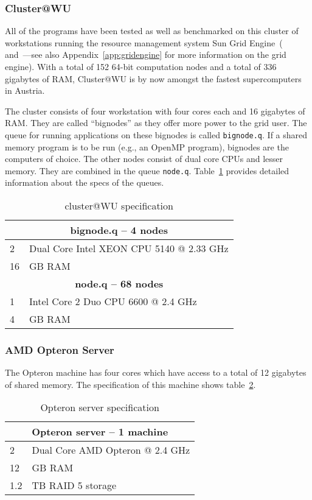 \begin{description}
\begin{description}
\subsubsection{Cluster@WU}
All of the programs
have been tested as well as benchmarked on this cluster of
workstations running the resource management system Sun Grid 
Engine~(\cite{gentzsch02sge} and~\cite{sge07}---see also
Appendix~\ref{app:gridengine} for more information on the 
grid engine). With a total of 152 64-bit computation nodes and a total
of 336 gigabytes of RAM, Cluster@WU is by now amongst the fastest
supercomputers in Austria.

The cluster consists of four workstation with four cores each and 16
gigabytes of RAM. They are called ``bignodes'' as they offer more
power to the grid user. The queue for running applications on these
bignodes is called \texttt{bignode.q}. If a shared memory program is
to be run (e.g., an OpenMP program), bignodes are the computers of choice.
The other nodes consist of dual core CPUs and lesser
memory. They are combined in the queue
\texttt{node.q}. Table~\ref{tab:clusterWU} provides detailed
information about the specs of the queues.

\begin{table}[h!b!p!]
\caption{cluster@WU specification}
\centering
\label{tab:clusterWU}
\begin{tabular}{|l|l|}
\hline
\multicolumn{2}{|c|}{\textbf{bignode.q -- 4 nodes}}\\
\hline
2  & Dual Core Intel XEON CPU 5140 @ 2.33 GHz\\
16 & GB RAM\\
\hline
\multicolumn{2}{|c|}{\textbf{node.q -- 68 nodes}}\\
\hline
1 & Intel Core 2 Duo CPU 6600 @ 2.4 GHz\\
4 & GB RAM\\
\hline
\end{tabular}
\end{table}

\subsubsection{AMD Opteron Server}
The Opteron machine has four cores which
have access to a total of 12 gigabytes of shared memory. The
specification of this machine shows table~\ref{tab:opteronserver}.

\begin{table}[h!b!p!]
\centering
\caption{Opteron server specification}
\label{tab:opteronserver}
\begin{tabular}{|l|l|}
\hline
\multicolumn{2}{|c|}{\textbf{Opteron server -- 1 machine}}\\
\hline
2  & Dual Core AMD Opteron @ 2.4 GHz\\
12 & GB RAM\\
1.2& TB RAID 5 storage\\
\hline
\end{tabular}
\end{table}


\end{description}
\end{description}
